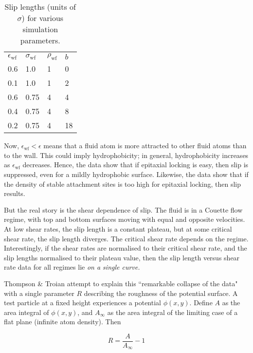 \documentclass[12pt, a4paper, twoside, openright]{book}
\newcommand{\ewf}{\ensuremath{\epsilon_{\mathrm{wf}}}}
\begin{document}
\begin{table}[h]
\centering
\caption{Slip lengths (units of $\sigma$) for various simulation parameters.} \label{tnt}
\begin{tabular}{l l l l}
\ewf & $\sigma_{\mathrm{wf}}$ & $\rho_{\mathrm{wf}}$ & $b$ \\
0.6  & 1.0                    & 1                    & 0 \\
0.1  & 1.0                    & 1                    & 2 \\
0.6  & 0.75                   & 4                    & 4 \\
0.4  & 0.75                   & 4                    & 8 \\
0.2  & 0.75                   & 4                    & 18 \\
\end{tabular}

\end{table}

Now, $\ewf < \epsilon$ means that a fluid atom is more attracted to other fluid atoms than to the wall.  This could imply hydrophobicity; in general, hydrophobicity increases as $\ewf$ decreases. Hence, the data show that if epitaxial locking is easy, then slip is suppressed, even for a mildly hydrophobic surface. Likewise, the data show that if the density of stable attachment sites is too high for epitaxial locking, then slip results.

But the real story is the shear dependence of slip. The fluid is in a Couette flow regime, with top and bottom surfaces moving with equal and opposite velocities.  At low shear rates, the slip length is a constant plateau, but at some critical shear rate, the slip length diverges. %
The critical shear rate depends on the regime.  Interestingly, if the shear rates are normalised to their critical shear rate, and the slip lengths normalised to their plateau value, then the slip length versus shear rate data for all regimes lie \emph{on a single curve.}

Thompson \& Troian attempt to explain this ``remarkable collapse of the data" with a single parameter $R$ describing the roughness of the potential surface. A test particle at a fixed height experiences a potential $\phi(x,y)$. Define $A$ as the area integral of $\phi(x,y)$, and $A_{\infty}$ as the area integral of the limiting case of a flat plane (infinite atom density). Then

\begin{equation}
R = \frac{A}{A_{\infty}} - 1
\end{equation}
\end{document}

